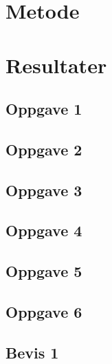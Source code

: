 \documentclass{article}
\begin{document}
\section{Metode} %
\label{sec:metode}

\newpage


\section{Resultater} %
\label{sec:resultater}


\subsection{Oppgave 1} %
\label{sub:oppgave_1}

\newpage


\subsection{Oppgave 2} %
\label{sub:oppgave_2}

\newpage


\subsection{Oppgave 3} %
\label{sub:oppgave_3}

\newpage


\subsection{Oppgave 4} %
\label{sub:oppgave_4}

\newpage


\subsection{Oppgave 5} %
\label{sub:oppgave_5}

\newpage


\subsection{Oppgave 6} %
\label{sub:oppgave_6}

\newpage


\subsection{Bevis 1} %
\label{sub:bevis_1}

\end{document}
